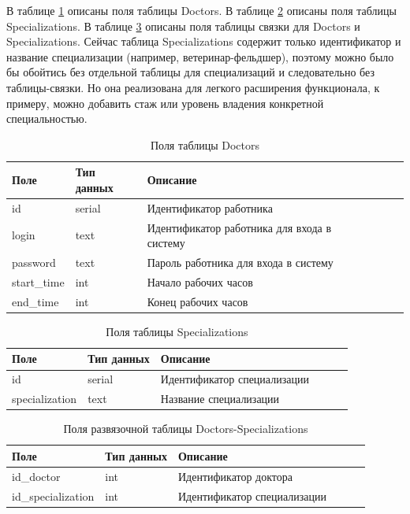 В таблице \ref{tab:doctors}  описаны поля таблицы Doctors. В таблице \ref{tab:specializations} описаны поля таблицы Specializations. В таблице \ref{tab:DC} описаны поля таблицы связки для Doctors и Specializations. Сейчас таблица Specializations содержит только идентификатор и название специализации (например, ветеринар-фельдшер), поэтому можно было бы обойтись без отдельной таблицы для специализаций и следовательно без таблицы-связки. Но она реализована для легкого расширения функционала, к примеру, можно добавить стаж или уровень владения конкретной специальностью.

\begin{table}[hbtp]
	\begin{center}
			\caption{\label{tab:doctors}Поля таблицы Doctors}
		\begin{tabular}{|l|l|l|l|l|l|}
			\hline {Поле} & {Тип данных} & {Описание}  \\ \hline
			id  & serial & Идентификатор работника   \\ \hline
			login & text & Идентификатор работника для входа в систему \\ \hline
			password & text & Пароль работника для входа в систему  \\ \hline
			start\_time & int & Начало рабочих часов\\ \hline
			end\_time & int & Конец рабочих часов\\ \hline
		\end{tabular}
	\end{center}
\end{table}

\begin{table}[hbtp]
	\begin{center}
		\caption{\label{tab:specializations}Поля таблицы Specializations}
		\begin{tabular}{|l|l|l|l|l|l|}
			\hline {Поле} & {Тип данных} & {Описание}  \\ \hline
			id  & serial & Идентификатор специализации \\ \hline
			specialization & text & Название специализации\\ \hline
		\end{tabular}
	\end{center}
\end{table}

\begin{table}[hbtp]
	\begin{center}
		\caption{\label{tab:DC}Поля развязочной таблицы Doctors-Specializations}
		\begin{tabular}{|l|l|l|l|l|l|}
			\hline {Поле} & {Тип данных} & {Описание}  \\ \hline
			id\_doctor  & int & Идентификатор доктора \\ \hline
			id\_specialization & int & Идентификатор специализации \\ \hline
		\end{tabular}
	\end{center}
\end{table}

